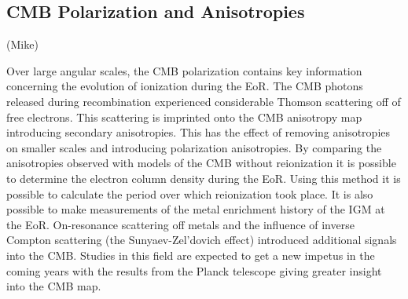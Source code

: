 
\subsection{CMB Polarization and Anisotropies} %
\label{sub:cmb_secondary_anisotropies}
(Mike)

	Over large angular scales, the CMB polarization contains key information concerning the evolution of ionization during the EoR. The CMB photons released during recombination experienced considerable Thomson scattering off of free electrons. This scattering is imprinted onto the CMB anisotropy map introducing secondary anisotropies. This has the effect of removing anisotropies on smaller scales and introducing polarization anisotropies. By comparing the anisotropies observed with models of the CMB without reionization it is possible to determine the electron column density during the EoR. Using this method it is possible to calculate the period over which reionization took place. It is also possible to make measurements of the metal enrichment history of the IGM at the EoR. On-resonance scattering off metals and the influence of inverse Compton scattering (the Sunyaev-Zel'dovich effect) introduced additional signals into the CMB\cite{Monteagudo2006}. Studies in this field are expected to get a new impetus in the coming years with the results from the Planck telescope giving greater insight into the CMB map.
